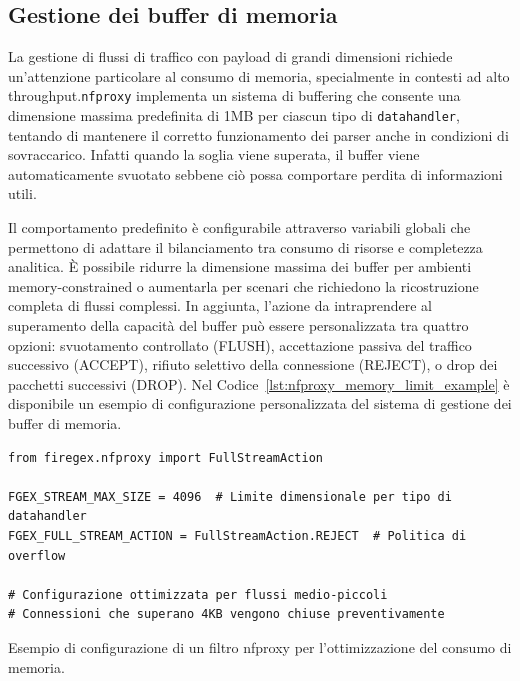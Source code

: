 \subsection{Gestione dei buffer di memoria}

La gestione di flussi di traffico con payload di grandi dimensioni richiede un'attenzione particolare al consumo di memoria, specialmente in contesti ad alto throughput.\@ \texttt{\gls{nfproxy}} implementa un sistema di buffering che consente una dimensione massima predefinita di 1MB per ciascun tipo di \texttt{datahandler}, tentando di mantenere il corretto funzionamento dei parser anche in condizioni di sovraccarico. Infatti quando la soglia viene superata, il buffer viene automaticamente svuotato sebbene ciò possa comportare perdita di informazioni utili.

Il comportamento predefinito è configurabile attraverso variabili globali che permettono di adattare il bilanciamento tra consumo di risorse e completezza analitica. È possibile ridurre la dimensione massima dei buffer per ambienti memory-constrained o aumentarla per scenari che richiedono la ricostruzione completa di flussi complessi. In aggiunta, l'azione da intraprendere al superamento della capacità del buffer può essere personalizzata tra quattro opzioni: svuotamento controllato (FLUSH), accettazione passiva del traffico successivo (ACCEPT), rifiuto selettivo della connessione (REJECT), o drop dei pacchetti successivi (DROP). Nel Codice~\ref{lst:nfproxy_memory_limit_example} è disponibile un esempio di configurazione personalizzata del sistema di gestione dei buffer di memoria.

\begin{listing}[H]
\begin{verbatim}
from firegex.nfproxy import FullStreamAction

FGEX_STREAM_MAX_SIZE = 4096  # Limite dimensionale per tipo di datahandler
FGEX_FULL_STREAM_ACTION = FullStreamAction.REJECT  # Politica di overflow

# Configurazione ottimizzata per flussi medio-piccoli
# Connessioni che superano 4KB vengono chiuse preventivamente
\end{verbatim}
\vspace{-1em}
\caption{Esempio di configurazione di un filtro nfproxy per l'ottimizzazione del consumo di memoria.}\label{lst:nfproxy_memory_limit_example}
\end{listing}

